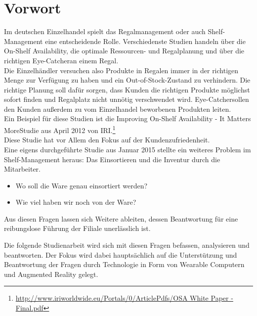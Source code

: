 \chapter{Vorwort}
\label{cha:vorwort}
Im deutschen Einzelhandel spielt das Regalmanagement oder auch Shelf-Management eine entscheidende Rolle. Verschiedenste Studien handeln über die \glqq On-Shelf Availability\grqq , die optimale Ressourcen- und Regalplanung und über die richtigen \glqq Eye-Catcher\grqq an einem Regal.\\

Die Einzelhändler versuchen also Produkte in Regalen immer in der richtigen Menge zur Verfügung zu haben und ein \glqq Out-of-Stock\grqq -Zustand zu verhindern. Die richtige Planung soll dafür sorgen, dass Kunden die richtigen Produkte möglichst sofort finden und Regalplatz nicht unnötig verschwendet wird. \glqq Eye-Catcher\grqq sollen den Kunden außerdem zu vom Einzelhandel beworbenen Produkten leiten.\\

Ein Beispiel für diese Studien ist \zB die \glqq Improving On-Shelf Availability - It Matters More\grqq Studie aus April 2012 von IRI.\footnote{\url{http://www.iriworldwide.eu/Portals/0/ArticlePdfs/OSA White Paper - Final.pdf}}\\

Diese Studie hat vor Allem den Fokus auf der Kundenzufriedenheit.\\

Eine eigens durchgeführte Studie aus Januar 2015 stellte ein weiteres Problem im Shelf-Management heraus: Das Einsortieren und die Inventur durch die Mitarbeiter.
\begin{itemize}
	\item Wo soll die Ware genau einsortiert werden?
	\item Wie viel haben wir noch von der Ware?
\end{itemize}
Aus diesen Fragen lassen sich Weitere ableiten, dessen Beantwortung für eine reibungslose Führung der Filiale unerlässlich ist.

Die folgende Studienarbeit wird sich mit diesen Fragen befassen, analysieren und beantworten. Der Fokus wird dabei hauptsächlich auf die Unterstützung und Beantwortung der Fragen durch Technologie in Form von Wearable Computern und Augmented Reality gelegt.